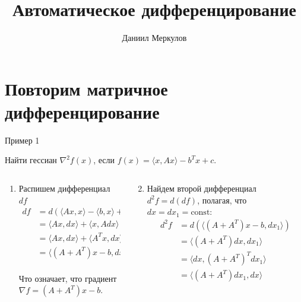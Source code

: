\documentclass[
  9pt,
  ignorenonframetext,
  aspectratio=169,
]{beamer}
\title{Автоматическое дифференцирование}
\author{Даниил Меркулов}
\date{}
\institute{Методы оптимизации. МФТИ}
\begin{document}
\frame{\titlepage}


\section{Повторим матричное
дифференцирование}\label{ux43fux43eux432ux442ux43eux440ux438ux43c-ux43cux430ux442ux440ux438ux447ux43dux43eux435-ux434ux438ux444ux444ux435ux440ux435ux43dux446ux438ux440ux43eux432ux430ux43dux438ux435}

\begin{frame}{Пример 1}
\label{ux43fux440ux438ux43cux435ux440-1}
\begin{tcolorbox}[enhanced jigsaw, bottomrule=.15mm, title=\textcolor{quarto-callout-color}{\faInfo}\hspace{0.5em}{Example}, breakable, opacitybacktitle=0.6, colbacktitle=quarto-callout-color!10!white, left=2mm, bottomtitle=1mm, colback=white, colframe=quarto-callout-color-frame, titlerule=0mm, toptitle=1mm, arc=.35mm, rightrule=.15mm, coltitle=black, toprule=.15mm, opacityback=0, leftrule=.75mm]

Найти гессиан \(\nabla^2 f(x)\), если
\(f(x) = \langle x, Ax\rangle -b^T x + c\).

\end{tcolorbox}

\pause

\begin{columns}[T]
\begin{column}{0.5\linewidth}
\begin{enumerate}[<+->]
\item
  Распишем дифференциал \(df\) \[
   \begin{split}
   df &= d\left(\langle Ax, x\rangle - \langle b, x\rangle + c\right) \\
   &= \langle Ax, dx\rangle + \langle x, Adx\rangle - \langle b, dx\rangle \\
   &= \langle Ax, dx\rangle + \langle A^Tx, dx\rangle - \langle b, dx\rangle \\
   &= \langle (A+A^T)x - b, dx\rangle  \\
   \end{split}
   \]

  Что означает, что градиент \(\nabla f = (A+A^T)x - b\).
\end{enumerate}
\end{column}

\pause

\begin{column}{0.5\linewidth}
\begin{enumerate}[<+->]
\setcounter{enumi}{1}
\item
  Найдем второй дифференциал \(d^2f = d(df)\), полагая, что
  \(dx=dx_1 = \text{const}\): \[
   \begin{split}
   d^2f &= d\left(\langle (A+A^T)x - b, dx_1\rangle\right) \\
   &= \langle (A+A^T)dx, dx_1\rangle \\
   &= \langle dx, (A+A^T)^Tdx_1\rangle \\
   &= \langle (A+A^T)dx_1, dx\rangle 
   \end{split}
   \]


\end{enumerate}
\end{column}
\end{columns}
\end{frame}
\end{document}
